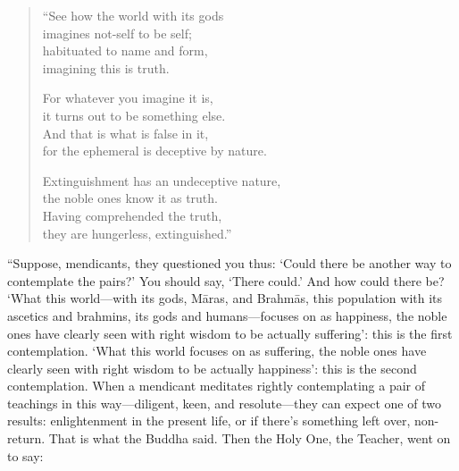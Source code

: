 \documentclass[12pt,openany]{book}%
\begin{document}
\begin{verse}%
“See how the world with its gods \\
imagines not-self to be self; \\
habituated to name and form, \\
imagining this is truth. 

For whatever you imagine it is, \\
it turns out to be something else. \\
And that is what is false in it, \\
for the ephemeral is deceptive by nature. 

Extinguishment has an undeceptive nature, \\
the noble ones know it as truth. \\
Having comprehended the truth, \\
they are hungerless, extinguished.” 

%
\end{verse}

“Suppose, mendicants, they questioned you thus: ‘Could there be another way to contemplate the pairs?’ You should say, ‘There could.’ And how could there be? ‘What this world—with its gods, \textsanskrit{Māras}, and \textsanskrit{Brahmās}, this population with its ascetics and brahmins, its gods and humans—focuses on as happiness, the noble ones have clearly seen with right wisdom to be actually suffering’: this is the first contemplation. ‘What this world focuses on as suffering, the noble ones have clearly seen with right wisdom to be actually happiness’: this is the second contemplation. When a mendicant meditates rightly contemplating a pair of teachings in this way—diligent, keen, and resolute—they can expect one of two results: enlightenment in the present life, or if there’s something left over, non-return. That is what the Buddha said. Then the Holy One, the Teacher, went on to say: 
\end{document}
